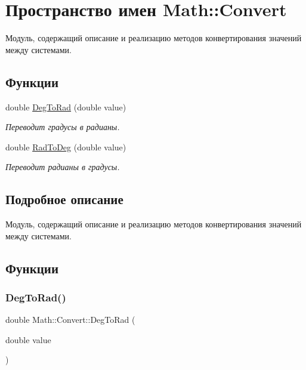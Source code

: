 \hypertarget{namespace_math_1_1_convert}{}\section{Пространство имен Math\+:\+:Convert}
\label{namespace_math_1_1_convert}


Модуль, содержащий описание и реализацию методов конвертирования значений между системами.  


\subsection*{Функции}
\begin{DoxyCompactItemize}
\item 
double \hyperlink{namespace_math_1_1_convert_a09e8179fe960a2e0776ca3c12bd47ecd}{Deg\+To\+Rad} (double value)
\begin{DoxyCompactList}\small\item\em Переводит градусы в радианы. \end{DoxyCompactList}\item 
double \hyperlink{namespace_math_1_1_convert_a06704cbaaeb06e60eed69d61b3d4d912}{Rad\+To\+Deg} (double value)
\begin{DoxyCompactList}\small\item\em Переводит радианы в градусы. \end{DoxyCompactList}\end{DoxyCompactItemize}


\subsection{Подробное описание}
Модуль, содержащий описание и реализацию методов конвертирования значений между системами. 

\subsection{Функции}
\hypertarget{namespace_math_1_1_convert_a09e8179fe960a2e0776ca3c12bd47ecd}{}\label{namespace_math_1_1_convert_a09e8179fe960a2e0776ca3c12bd47ecd} 
\subsubsection{\texorpdfstring{Deg\+To\+Rad()}{DegToRad()}}
{\footnotesize\ttfamily double Math\+::\+Convert\+::\+Deg\+To\+Rad (\begin{DoxyParamCaption}\item[{double}]{value }\end{DoxyParamCaption})\hspace{0.3cm}{\ttfamily [inline]}}



